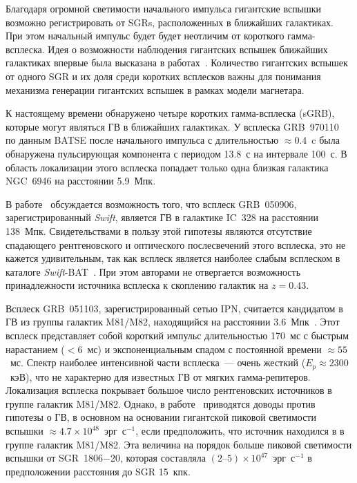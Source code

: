 Благодаря огромной светимости начального импульса гигантские вспышки возможно  
регистрировать от SGRs, расположенных в ближайших галактиках. При этом начальный 
импульс будет будет неотличим от короткого гамма-всплеска. Идея о возможности наблюдения 
гигантских вспышек ближайших галактиках впервые была высказана 
в работах~\citep{Mazets1981,Mazets1982}. Количество гигантских вспышек от одного 
SGR и их доля среди коротких всплесков важны для понимания механизма генерации 
гигантских вспышек в рамках модели магнетара.

К настоящему времени обнаружено четыре коротких гамма-всплеска (sGRB), которые могут 
являться ГВ в ближайших галактиках. У всплеска GRB~970110~\citep{Crider2006} 
по данным BATSE после начального импульса с длительностью $\approx 0.4$~c была 
обнаружена пульсирующая компонента с  периодом 13.8~с на интервале 100~с. В область 
локализации этого всплеска попадает только одна близкая галактика NGC~6946 
на расстоянии 5.9~Мпк. 

В работе~\citep{Levan2008} обсуждается возможность того, что всплеск GRB~050906, 
зарегистрированный \textit{Swift}, является ГВ в галактике 
IC~328 на расстоянии 138~Мпк. Свидетельствами в пользу этой гипотезы являются  
отсутствие спадающего рентгеновского и оптического послесвечений этого всплеска, 
это не кажется удивительным, так как всплеск является наиболее слабым всплеском 
в каталоге \textit{Swift}-BAT~\citep{Sakamoto2011ApJS}. При этом 
авторами не отвергается возможность принадлежности источника всплеска к скоплению 
галактик на $z = 0.43$. 

Всплеск GRB~051103, зарегистрированный сетью IPN, считается 
кандидатом в ГВ из группы галактик M81/M82, находящийся на расстоянии 
3.6~Мпк~\citep{Ofek2006, Frederiks2007a, Hurley2010}. 
Этот всплеск представляет собой короткий импульс длительностью 170~мс с быстрым 
нарастанием ($<6$~мс) и экспоненциальным спадом с постоянной времени $\approx 55$~мс. 
Спектр наиболее интенсивной части всплеска~--- очень жесткий  ($E_p \approx 2300$~кэВ), 
что не характерно для известных ГВ от мягких гамма-репитеров. Локализация всплеска 
покрывает большое число рентгеновских источников в группе галактик M81/M82. Однако, 
в работе~\citep{Hurley2010} приводятся доводы против гипотезы о ГВ, в основном 
на основании гигантской пиковой светимости вспышки $\approx 4.7\times10^{48}$~эрг~с$^{-1}$,
если предположить, что источник находился в в группе галактик M81/M82. 
Эта величина на порядок больше пиковой светимости вспышки от SGR~1806$-$20, которая 
составляла $(2\textrm{--}5)\times 10^{47}$~эрг~с$^{-1}$ в предположении 
расстояния до SGR 15~кпк.


